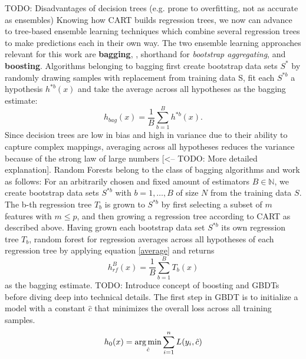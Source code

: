 \newline
TODO: Disadvantages of decision trees (e.g. prone to overfitting, not as accurate as ensembles)
\newline
\newline
Knowing how CART builds regression trees, we now can advance to tree-based ensemble learning techniques which combine several regression trees to make predictions each in their own way.
The two ensemble learning approaches relevant for this work are \textbf{bagging}, , shorthand for \textit{bootstrap aggregating}, and \textbf{boosting}. 
Algorithms belonging to bagging first create bootstrap data sets $ S^{*} $ by randomly drawing samples with replacement from training data S, fit each $ S^{*b} $ a hypothesis $ h^{*b}(x) $ and take the average across all hypotheses as the bagging estimate: 
\begin{equation}\label{average}
	h_{bag}(x) = \dfrac{1}{B} \sum_{b=1}^{B} h^{*b}(x).
\end{equation}
Since decision trees are low in bias and high in variance due to their ability to capture complex mappings, averaging across all hypotheses reduces the variance because of the strong law of large numbers [<-- TODO: More detailed explanation].
Random Forests belong to the class of bagging algorithms and work as follows:
For an arbitrarily chosen and fixed amount of estimators $ B \in \mathbb{N}$, we create bootstrap data sets $ S^{*b} $ with $ b = 1, \dots, B $ of size $ N $ from the training data $ S $. The b-th regression tree $ T_b $ is grown to $ S^{*b} $ by first selecting a subset of $ m $ features with $ m \leq p $, and then growing a regression tree according to CART as described above.
Having grown each bootstrap data set $ S^{*b} $ its own regression tree $ T_b $, random forest for regression averages across all hypotheses of each regression tree by applying equation \ref{average} and returns
\begin{equation}
h^{B}_{rf}(x) = \dfrac{1}{B} \sum_{b=1}^{B} T_b(x)
\end{equation}
as the bagging estimate.
\newline
\newline
TODO: Introduce concept of boosting and GBDTs before diving deep into technical details.
\newline
\newline
The first step in GBDT is to initialize a model with a constant $ \hat{c} $ that minimizes the overall loss across all training samples.
\begin{equation}
h_{0}(x) =  \operatorname*{arg\,min}_{\hat{c}} \sum_{i=1}^n L(y_i,\hat{c}) \label{gbdt_step1}
\end{equation}

